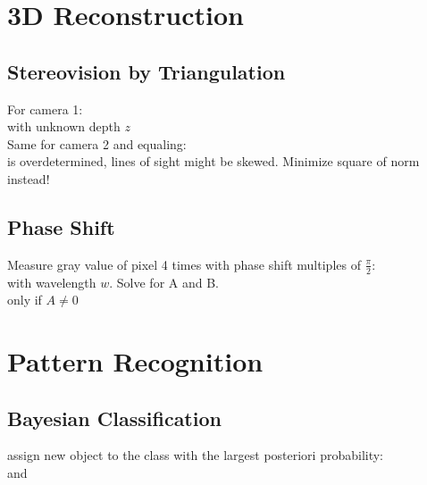 \documentclass[a4paper,12pt,pdftex]{scrreprt}
\begin{document}
	\chapter{3D Reconstruction} %
	\label{cha:3d_reconstruction}

	\section{Stereovision by Triangulation} %
	\label{sec:stereovision_by_triangulation}
	For camera 1:\\
	 with unknown depth $z$\\
	Same for camera 2 and equaling:\\
	 is overdetermined, lines of sight might be skewed. Minimize square of norm instead!\\

	\section{Phase Shift} %
	\label{sec:phase_shift}
	Measure gray value of pixel 4 times with phase shift multiples of $\frac{\pi}{2}$:\\
	 with wavelength $w$. Solve for A and B.\\
	 only if $A\neq0$

	\chapter{Pattern Recognition} %
	\label{cha:pattern_recognition}

	\section{Bayesian Classification} %
	\label{sec:bayesian_classification}
	assign new object to the class with the largest posteriori probability:\\
	 and 
\end{document}
